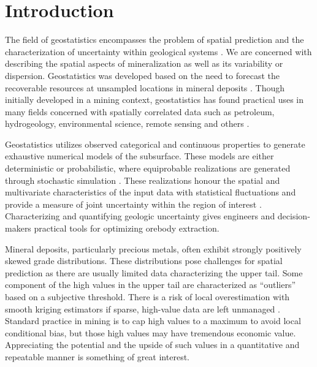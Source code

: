 
\chapter{Introduction}
\label{ch:01intro}

The field of geostatistics encompasses the problem of spatial prediction and the characterization of uncertainty within geological systems \citep{deutsch1992geostatistical}. We are concerned with describing the spatial aspects of mineralization as well as its variability or dispersion. Geostatistics was developed based on the need to forecast the recoverable resources at unsampled locations in mineral deposits \citep{matheron1963principles}. Though initially developed in a mining context, geostatistics has found practical uses in many fields concerned with spatially correlated data such as petroleum, hydrogeology, environmental science, remote sensing and others \citep{goovaerts1997geostatistics}.

Geostatistics utilizes observed categorical and continuous properties to generate exhaustive numerical models of the subsurface. These models are either deterministic or probabilistic, where equiprobable realizations are generated through stochastic simulation \citep{chiles2012geostatistics}. These realizations honour the spatial and multivariate characteristics of the input data with statistical fluctuations and provide a measure of joint uncertainty within the region of interest \citep{rossi2013mineral}. Characterizing and quantifying geologic uncertainty gives engineers and decision-makers practical tools for optimizing orebody extraction.

Mineral deposits, particularly precious metals, often exhibit strongly positively skewed grade distributions. These distributions pose challenges for spatial prediction as there are usually limited data characterizing the upper tail. Some component of the high values in the upper tail are characterized as ``outliers'' based on a subjective threshold. There is a risk of local overestimation with smooth kriging estimators if sparse, high-value data are left unmanaged \citep{leuangthong2015dealing}. Standard practice in mining is to cap high values to a maximum to avoid local conditional bias, but those high values may have tremendous economic value. Appreciating the potential and the upside of such values in a quantitative and repeatable manner is something of great interest.

